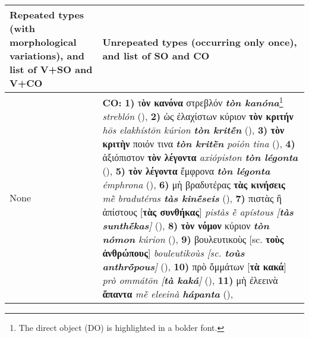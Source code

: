 \documentclass[output=paper,colorlinks,citecolor=brown]{langscibook}
\begin{document}
\begin{table}
\footnotesize
\begin{tabularx}{\textwidth}{QQ}
        \lsptoprule
        Repeated types (with morphological variations), and list of V+SO and V+CO & Unrepeated types (occurring only once), and list of SO and CO     \\
        \midrule
        None
        &
        \textbf{CO:} \newline
        \textbf{1)} τ\textbf{ὸν κανόνα} στρεβλόν \textit{\textbf{tòn kanóna}}\footnote{\tiny The direct object (DO) is highlighted in a bolder font.}
        \textit{streblón} (), \newline
        \textbf{2)} ὡς ἐλαχίστων κύριον \textbf{τὸν κριτήν} \textit{hōs elakhístōn kúrion \textbf{tòn kritḗn}} (), \newline
        \textbf{3)} \textbf{τὸν κριτὴν} ποιόν τινα \textit{\textbf{tòn kritḕn} poión tina} (), \newline
        \textbf{4)} ἀξιόπιστον \textbf{τὸν λέγοντα} \textit{axiópiston \textbf{tòn légonta}} (), \newline
        \textbf{5)} \textbf{τὸν λέγοντα} ἔμφρονα \textit{\textbf{tòn légonta} émphrona} (), \newline
        \textbf{6)} μὴ βραδυτέρας \textbf{τὰς κινήσεις} \textit{mḕ bradutéras \textbf{tàs kinḗseis}} (), \newline
        \textbf{7)} πιστὰς ἢ ἀπίστους [\textbf{τὰς συνθήκας}] \textit{pistàs ḕ apístous [\textbf{tàs sunthḗkas}]} (), \newline
        \textbf{8)} \textbf{τὸν νόμον} κύριον \textit{\textbf{tòn nómon} kúrion} (), \newline
        \textbf{9)} βουλευτικοὺς [sc. \textbf{τοὺς ἀνθρώπους}] \textit{bouleutikoùs [sc. \textbf{toùs anthrṓpous}]} (), \newline
        \textbf{10)} πρὸ ὄμμάτων [\textbf{τὰ κακά}] \textit{prò ommátōn [\textbf{tà kaká}]} (), \newline
        \textbf{11)} μὴ ἐλεεινὰ \textbf{ἅπαντα} \textit{mḕ eleeinà \textbf{hápanta}} (),\newline

\end{tabularx}
\end{table}
\end{document}
